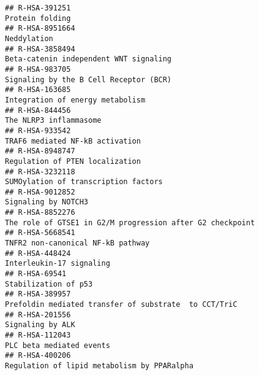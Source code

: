 \documentclass[
]{article}
\begin{document}
\begin{verbatim}
## R-HSA-391251                                                                                                                       Protein folding
## R-HSA-8951664                                                                                                                          Neddylation
## R-HSA-3858494                                                                                               Beta-catenin independent WNT signaling
## R-HSA-983705                                                                                                Signaling by the B Cell Receptor (BCR)
## R-HSA-163685                                                                                                      Integration of energy metabolism
## R-HSA-844456                                                                                                                The NLRP3 inflammasome
## R-HSA-933542                                                                                                       TRAF6 mediated NF-kB activation
## R-HSA-8948747                                                                                                      Regulation of PTEN localization
## R-HSA-3232118                                                                                                 SUMOylation of transcription factors
## R-HSA-9012852                                                                                                                  Signaling by NOTCH3
## R-HSA-8852276                                                                            The role of GTSE1 in G2/M progression after G2 checkpoint
## R-HSA-5668541                                                                                                    TNFR2 non-canonical NF-kB pathway
## R-HSA-448424                                                                                                              Interleukin-17 signaling
## R-HSA-69541                                                                                                                   Stabilization of p53
## R-HSA-389957                                                                                 Prefoldin mediated transfer of substrate  to CCT/TriC
## R-HSA-201556                                                                                                                      Signaling by ALK
## R-HSA-112043                                                                                                              PLC beta mediated events
## R-HSA-400206                                                                                           Regulation of lipid metabolism by PPARalpha

\end{verbatim}
\end{document}
